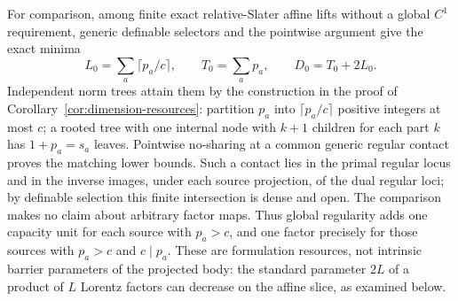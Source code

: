 For comparison, among finite exact relative-Slater affine lifts without
a global $C^1$ requirement, generic definable selectors and the
pointwise argument give the exact minima
\begin{equation}\label{eq:nonsmooth-product}
 L_0=\sum_a\lceil p_a/c\rceil,\qquad T_0=\sum_ap_a,
 \qquad D_0=T_0+2L_0.
\end{equation}
Independent norm trees attain them by the construction in the proof of
Corollary~\ref{cor:dimension-resources}: partition $p_a$ into $\lceil p_a/c\rceil$
positive integers at most $c$; a rooted tree with one internal node with
$k+1$ children for each part $k$ has $1+p_a=s_a$ leaves. Pointwise
no-sharing at a common generic regular contact proves the matching lower
bounds. Such a contact
lies in the primal regular locus and in the inverse images, under each
source projection, of the dual regular loci; by definable selection this
finite intersection is dense and open. The comparison makes no claim
about arbitrary factor maps. Thus global regularity adds one capacity
unit for each source with $p_a>c$, and one factor precisely for those
sources with $p_a>c$ and $c\mid p_a$. These are formulation resources,
not intrinsic barrier parameters of the projected body: the standard
parameter $2L$ of a product of $L$ Lorentz factors can decrease on
the affine slice, as examined below.

